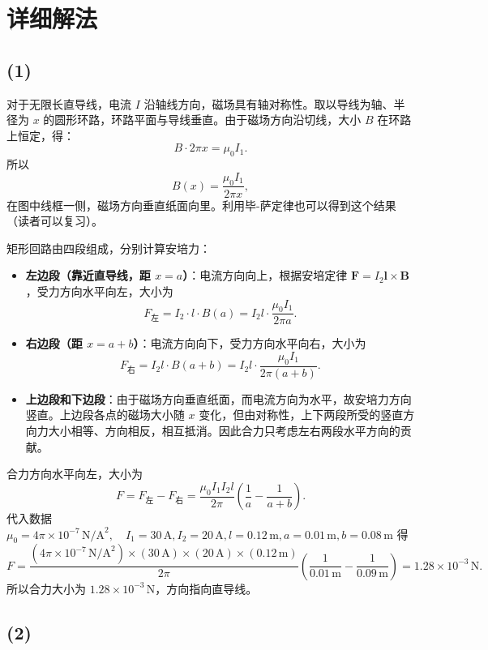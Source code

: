 \documentclass[11pt,a4paper]{ctexart}
\begin{document}
\section*{详细解法}

\subsection*{(1) }

对于无限长直导线，电流 \(I\) 沿轴线方向，磁场具有轴对称性。取以导线为轴、半径为 \(x\) 的圆形环路，环路平面与导线垂直。由于磁场方向沿切线，大小 \(B\) 在环路上恒定，得：
\[
B \cdot 2\pi x = \mu_0 I_1 .
\]
所以
\[
B(x) = \frac{\mu_0 I_1}{2\pi x},
\]
在图中线框一侧，磁场方向垂直纸面向里。利用毕-萨定律也可以得到这个结果（读者可以复习）。

矩形回路由四段组成，分别计算安培力：

\begin{itemize}
\item \textbf{左边段（靠近直导线，距 $x=a$）}：电流方向向上，根据安培定律 $\boldsymbol{F}=I_2 \boldsymbol{l} \times \boldsymbol{B}$，受力方向水平向左，大小为
\[
F_{\text{左}} = I_2 \cdot l \cdot B(a) = I_2 l \cdot \frac{\mu_0 I_1}{2\pi a}.
\]

\item \textbf{右边段（距 $x=a+b$）}：电流方向向下，受力方向水平向右，大小为
\[
F_{\text{右}} = I_2 l \cdot B(a+b) = I_2 l \cdot \frac{\mu_0 I_1}{2\pi (a+b)}.
\]

\item \textbf{上边段和下边段}：由于磁场方向垂直纸面，而电流方向为水平，故安培力方向竖直。上边段各点的磁场大小随 $x$ 变化，但由对称性，上下两段所受的竖直方向力大小相等、方向相反，相互抵消。因此合力只考虑左右两段水平方向的贡献。
\end{itemize}
合力方向水平向左，大小为
\[
F = F_{\text{左}} - F_{\text{右}} = \frac{\mu_0 I_1 I_2 l}{2\pi} \left( \frac{1}{a} - \frac{1}{a+b} \right).
\]
代入数据
$
\mu_0 = 4\pi \times 10^{-7}\,\text{N/A}^2,\quad
I_1 = 30\,\text{A},
I_2 = 20\,\text{A},
l = 0.12\,\text{m},
a = 0.01\,\text{m},
b = 0.08\,\text{m}
$
得
\[
F = \frac{(4\pi \times 10^{-7}\,\text{N/A}^2) \times (30\,\text{A}) \times (20\,\text{A}) \times (0.12\,\text{m})}{2\pi} \left( \frac{1}{0.01\,\text{m}} - \frac{1}{0.09\,\text{m}} \right) = 1.28 \times 10^{-3}\,\text{N}.
\]
所以合力大小为 $1.28\times10^{-3}\,\text{N}$，方向指向直导线。

\subsection*{(2) }
\end{document}
